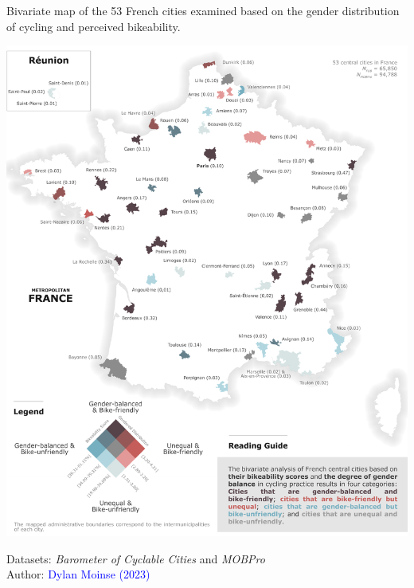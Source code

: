 \begin{refsegment}
\begin{carte}[h!]\vspace*{4pt}
    \caption{Bivariate map of the 53 French cities examined based on the gender distribution of cycling and perceived bikeability.}
    \label{fig-chap4:carte-bivariee-genre-cyclabilite}
    \centerline{\includegraphics[width=1\columnwidth]{src/Figures/Chap-4/EN_Carte_bivariee_cyclabilite_genre_OLS.png}}
    \vspace{5pt}
    \begin{flushright}\scriptsize{
    Datasets: \textsl{Barometer of Cyclable Cities} \textcolor{blue}{\autocite{fub_barometre_2021}} and \textsl{MOBPro} \textcolor{blue}{\autocite{insee_documentation_2023}}
    \\
    Author: \textcolor{blue}{Dylan Moinse (2023)}
    }\end{flushright}
\end{carte}


\end{refsegment}
